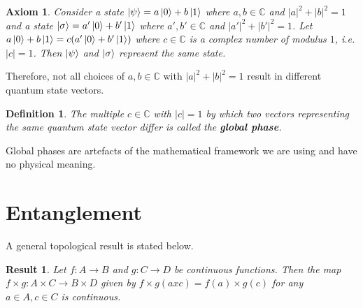 \documentclass[12pt,twoside,fleqn]{report}
\theoremstyle{thmstyle}
\newtheorem{defn}{Definition}[chapter]
\newtheorem{result}{Result}[chapter]
\newtheorem{axiom}{Axiom}[chapter]
\begin{document}
\begin{samepage}
\begin{axiom}
Consider a state $\ket{\psi} = a \ket{0} + b \ket{1}$ where $a,b \in \mathbb{C}$ and $|a|^2 + |b|^2 = 1$ and a state $\ket{\sigma} = a' \ket{0} + b' \ket{1}$ where $a',b' \in \mathbb{C}$ and $|a'|^2 + |b'|^2 = 1$. Let $a \ket{0} + b \ket{1} = c (a' \ket{0} + b' \ket{1})$ where $c \in \mathbb{C}$ is a complex number of modulus $1$, i.e. $|c| = 1$. Then $\ket\psi$ and $\ket\sigma$ represent the same state.
\end{axiom}

Therefore, not all choices of $a, b \in \mathbb{C}$ with $|a|^2 + |b|^2 = 1$ result in different quantum state vectors. 
\begin{defn}
The multiple $c \in \mathbb{C}$ with $|c| = 1$ by which two vectors representing the same quantum state vector differ is called the \textbf{global phase}. 
\end{defn}
Global phases are artefacts of the mathematical framework we are using and have no physical meaning.
\end{samepage}



\pagebreak
\section{Entanglement}

\begin{comment}
x notation for tensor product of vectors
x Simple notation
x properties of tensor product of vectors
* orthonormal basis for tensor product space
* Inner product defined on space of tensor products of vectors
* Definition of tensor product of spaces -- Hilbert space
* Notation for tensor product of spaces
* Tensor product multiplication rules
* Principle of Entanglement
* Proof that most states are entangled
\end{comment}


A general topological result is stated below.
\begin{result}
    \label{product:continuous}
    Let $f: A \to B$ and $g: C \to D$ be continuous functions. 
    Then the map $f \times g: A \times C \to B \times D$ given by $f \times g (a x c) = f(a) \times g(c)$ for any $a \in A, c \in C$ is continuous.
\end{result}
\end{document}
